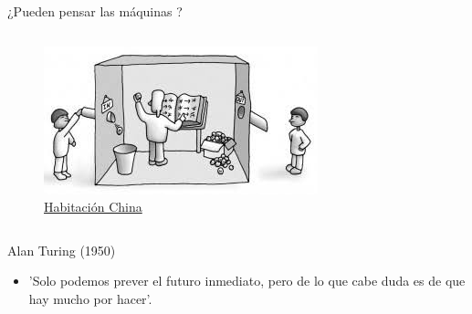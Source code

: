 \begin{frame}[fragile]{¿Pueden pensar las máquinas ?}
\begin{columns}
\begin{column}{0.5\textwidth}
\begin{figure}
			\includegraphics[width=\textwidth]{Automatas/descarga}
			\caption{\href{https://horaciobacon.wordpress.com/2017/06/29/el-extrano-caso-de-la-habitacion-china/}{Habitación China}}
		\end{figure}
	\end{column}
\end{columns}

\end{frame}


\begin{frame}[fragile]{}

\begin{block}{Alan Turing (1950) }
	
	\begin{itemize}
		\item  ’Solo podemos prever el futuro inmediato, pero de lo
		que cabe duda es de que hay mucho por hacer’.
	\end{itemize}
	
\end{block}

\end{frame}

